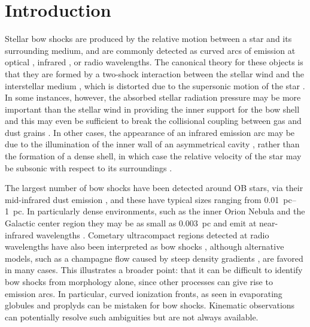 
\section{Introduction}
\label{sec:introduction}

Stellar bow shocks are produced by the relative motion between a star
and its surrounding medium, and are commonly detected as curved arcs
of emission at optical \citep{Gull:1979a, Brown:2005a}, infrared
\citep{van-Buren:1988a, Kobulnicky:2016a}, or radio
\citep{van-Buren:1990a, Benaglia:2010a} wavelengths.  The canonical
theory for these objects is that they are formed by a two-shock
interaction between the stellar wind and the interstellar medium
\citep{Pikelner:1968a, Dyson:1972a}, which is distorted due to the
supersonic motion of the star \citep{Baranov:1970a, Wilkin:1996a}.  In
some instances, however, the absorbed stellar radiation pressure may
be more important than the stellar wind in providing the inner support
for the bow shell \citep[Paper~I]{Henney:2019a} and this may even be
sufficient to break the collisional coupling between gas and dust
grains \citep[Paper~II]{Henney:2019b}.  In other cases, the appearance
of an infrared emission arc may be due to the illumination of the
inner wall of an asymmetrical cavity \citep{Mackey:2016a}, rather than
the formation of a dense shell, in which case the relative velocity of
the star may be subsonic with respect to its surroundings
\citep{Mackey:2015a}.

The largest number of bow shocks have been detected around OB stars,
via their mid-infrared dust emission \citep{van-Buren:1995a,
  Noriega-Crespo:1997b, Povich:2008a, Kobulnicky:2010a, Peri:2012a,
  Peri:2015a, Sexton:2015b, Kobulnicky:2016a, Bodensteiner:2018a}, and
these have typical sizes ranging from \SIrange{0.01}{1}{pc}. In
particularly dense environments, such as the inner Orion Nebula
\citep{Smith:2005a} and the Galactic center region
\citep{Geballe:2004a} they may be as small as \SI{0.003}{pc} and emit
at near-infrared wavelengths \citep{Tanner:2005a,
  Sanchez-Bermudez:2014a}.  Cometary ultracompact \hii{} regions
detected at radio wavelengths \citep{Reid:1985a, Wood:1989a,
  Klaassen:2018a} have also been interpreted as bow shocks
\citep{van-Buren:1990a, Mac-Low:1991a}, although alternative models,
such as a champagne flow caused by steep density gradients
\citep{Cyganowski:2003a, Arthur:2006a, Immer:2014a, Steggles:2017a},
are favored in many cases.  This illustrates a broader point: that it
can be difficult to identify bow shocks from morphology alone, since
other processes can give rise to emission arcs.  In particular, curved
ionization fronts, as seen in evaporating globules \citep{Sahai:2012b}
and proplyds \citep{ODell:1993a} can be mistaken for bow shocks.
Kinematic observations can potentially resolve such ambiguities but
are not always available.

